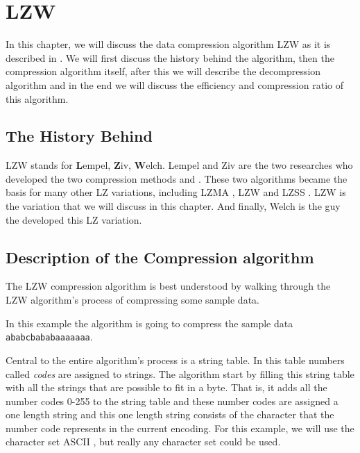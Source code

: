 \begin{comment}
  
\end{comment}

\chapter{LZW}
\label{cha:lzw}

\begin{refsection}

  In this chapter, we will discuss the data compression algorithm LZW
  as it is described in
  \cite{nelson89:_lzw_data_compr,Welch:1984:THD:1319729.1320134,Salomon:2004:DCC}. We
  will first discuss the history behind the algorithm, then the
  compression algorithm itself, after this we will describe the
  decompression algorithm and in the end we will discuss the
  efficiency and compression ratio of this algorithm.

\section{The History Behind}

LZW stands for \textbf{L}empel, \textbf{Z}iv, \textbf{W}elch. Lempel
and Ziv are the two researches who developed the two compression
methods \lzseven and \lzeight. These two algorithms became the basis
for many other LZ variations, including LZMA \cite{palov11}, LZW and
LZSS \cite{Salomon:2004:DCC}. LZW is the variation that we will
discuss in this chapter. And finally, Welch is the guy the developed
this LZ variation.

\section{Description of the Compression algorithm}
\label{sec:lzw-comp-desc}

The LZW compression algorithm is best
understood by walking through the LZW algorithm's process of
compressing some sample data.

In this example the algorithm is going to compress the sample data
\texttt{ababcbababaaaaaaa}.

Central to the entire algorithm's process is a string table. In this
table numbers called \textit{codes} are assigned to
strings. The algorithm start by filling this string table with all the
strings that are possible to fit in a byte. That is, it adds all the
number codes 0-255 to the string table and these number codes are
assigned a one length string and this one length string consists of
the character that the number code represents in the current
encoding. For this example, we will use the character set ASCII
\cite{rfc20}, but really any character set could be used.


\end{refsection}

